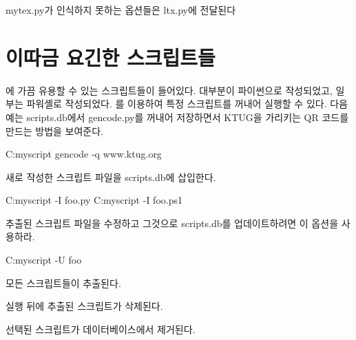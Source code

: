 mytex.py가 인식하지 못하는 옵션들은 ltx.py에 전달된다

\section{이따금 요긴한 스크립트들}
\label{sec:myscript}

에 가끔 유용할 수 있는 스크립트들이 들어있다. 
대부분이 파이썬으로 작성되었고, 일부는 파워셸로 작성되었다.
를 이용하여 특정 스크립트를 꺼내어 실행할 수 있다.
다음 예는 scripts.db에서 gencode.py를 꺼내어 저장하면서 KTUG을 가리키는 QR 코드를 만드는 방법을 보여준다.

\begin{code}
C:\>myscript gencode -q www.ktug.org
\end{code}

\begin{macros}
\item[-I] 새로 작성한 스크립트 파일을 scripts.db에 삽입한다.
\begin{code}
C:\>myscript -I foo.py
C:\>myscript -I foo.ps1
\end{code}

\item[-U] 추출된 스크립트 파일을 수정하고 그것으로 scripts.db를 업데이트하려면 이 옵션을 사용하라.
\begin{code}
C:\>myscript -U foo
\end{code}

\item[-B] 모든 스크립트들이 추출된다.
\item[-C] 실행 뒤에 추출된 스크립트가 삭제된다.
\item[-R] 선택된 스크립트가 데이터베이스에서 제거된다.
\end{macros}
